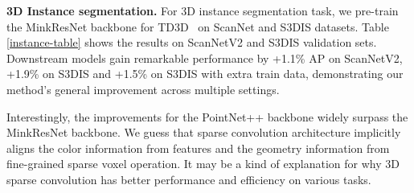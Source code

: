 \documentclass{article}
\begin{document}
\textbf{3D Instance segmentation.} For 3D instance segmentation task, we pre-train the MinkResNet backbone for TD3D~\cite{TD3D} on ScanNet and S3DIS datasets.
Table \ref{instance-table} shows the results on ScanNetV2 and S3DIS validation sets. Downstream models gain remarkable performance
by +1.1\% AP on ScanNetV2, +1.9\% on S3DIS and +1.5\% on S3DIS with extra train data, demonstrating our method's general improvement across multiple settings.

Interestingly, the improvements for the PointNet++ backbone widely surpass the MinkResNet backbone. We guess that sparse convolution architecture implicitly aligns the color information from features and the geometry information from fine-grained sparse voxel operation. It may be a kind of explanation for why 3D sparse convolution has better performance and efficiency on various tasks.
\end{document}
